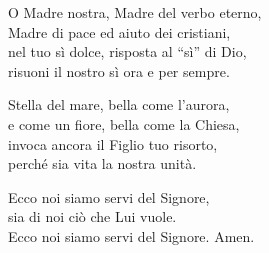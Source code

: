 
\strofa O Madre nostra, Madre del verbo eterno,\\
Madre di pace ed aiuto dei cristiani,\\
nel tuo sì dolce, risposta al ``sì'' di Dio,\\
risuoni il nostro sì ora e per sempre.

\spazio


\spazio

 

\spazio

\strofa Stella del mare, bella come l'aurora,\\
e come un fiore, bella come la Chiesa,\\
invoca ancora il Figlio tuo risorto,\\
perché sia vita la nostra unità.

\spazio


\spazio

\strofa Ecco noi siamo servi del Signore,\\
sia di noi ciò che Lui vuole.\\
Ecco noi siamo servi del Signore. Amen. 
